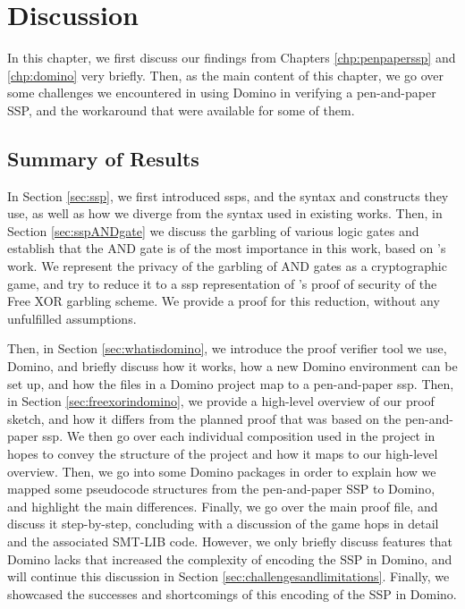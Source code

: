 \chapter{Discussion}
\label{chp:discussion}
In this chapter, we first discuss our findings from Chapters \ref{chp:penpaperssp} and \ref{chp:domino} very briefly. Then, as the main content of this chapter, we go over some challenges we encountered in using Domino in verifying a pen-and-paper SSP, and the workaround that were available for some of them.

\section{Summary of Results}
\label{sec:summaryofresults}
In Section \ref{sec:ssp}, we first introduced \acrshort{ssp}s, and the syntax and constructs they use, as well as how we diverge from the syntax used in existing works. Then, in Section \ref{sec:sspANDgate} we discuss the garbling of various logic gates and establish that the AND gate is of the most importance in this work, based on \citeauthor{ALP:KolSch08}'s work. We represent the privacy of the garbling of AND gates as a cryptographic game, and try to reduce it to a \acrshort{ssp} representation of \citeauthor{JC:Applebaum16}'s proof of security of the Free XOR garbling scheme. We provide a proof for this reduction, without any unfulfilled assumptions.

Then, in Section \ref{sec:whatisdomino}, we introduce the proof verifier tool we use, Domino, and briefly discuss how it works, how a new Domino environment can be set up, and how the files in a Domino project map to a pen-and-paper \acrshort{ssp}. Then, in Section \ref{sec:freexorindomino}, we provide a high-level overview of our proof sketch, and how it differs from the planned proof that was based on the pen-and-paper \acrshort{ssp}. We then go over each individual composition used in the project in hopes to convey the structure of the project and how it maps to our high-level overview. Then, we go into some Domino packages in order to explain how we mapped some pseudocode structures from the pen-and-paper SSP to Domino, and highlight the main differences. Finally, we go over the main proof file, and discuss it step-by-step, concluding with a discussion of the game hops in detail and the associated SMT-LIB code. However, we only briefly discuss features that Domino lacks that increased the complexity of encoding the SSP in Domino, and will continue this discussion in Section \ref{sec:challengesandlimitations}. Finally, we showcased the successes and shortcomings of this encoding of the SSP in Domino.  

